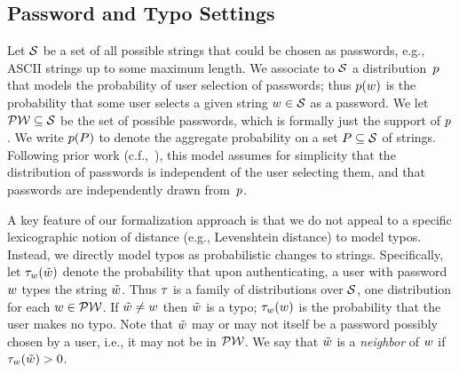 
\iffalse
A distance measure $\dist$ is a function
$\dist\Colon\PW\times\PW\rightarrow\R^+$.  We will often denote
$\dist(\pw,\pwtypo)$ by $\dist_\pw(\pwtypo)$.  The neighborhood of
$\delta$-close points of a password $\pw \in \PW$ is the set
$\ball_{\dist,\delta}(\pw) = \{\pwtypo \;|\; \pwtypo \in \PW
\textnormal{ and } \dist_\pw(\pwtypo) \le \delta\}$.
When $\dist$ and $\delta$ are clear from context we will write simply
$\ball(\pw)$ and call this the ball centered at $\pw$.
\fi

\subsection{Password and Typo Settings}

Let $\mathcal{S}$ be a set of all possible strings that could be chosen as
passwords, e.g., ASCII strings up to some maximum length.  We associate to
$\mathcal{S}$ a distribution~$p$ that models the probability of user
selection of passwords; thus $p({w})$ is the probability that some user
selects a given string ${w} \in \mathcal{S}$ as a password. We let $\mathcal{PW} \subseteq
\mathcal{S}$ be the set of possible passwords, which is formally just the support
of $p$.  We write $p(P)$ to denote the aggregate probability on a
set $P \subseteq \mathcal{S}$ of strings.  Following prior work
(c.f.,~\cite{bhos12}), this model assumes for simplicity that the distribution of
passwords is independent of the user selecting them, and that passwords are
independently drawn from~$p$.

A key feature of our formalization approach is that we do not appeal
to a specific lexicographic notion of distance (e.g., Levenshtein
distance) to model typos. Instead, we directly model typos as
probabilistic changes to strings. Specifically, let
$\tau_{{w}}(\tilde{w})$ denote the probability that upon
authenticating, a user with password $\pw$ types the string
$\tilde{w}$. Thus $\tau$ is a family of distributions over
$\mathcal{S}$, one distribution for each $\pw \in \PW$. If
$\tilde{w} \neq {w}$ then $\tilde{w}$ is a typo; $\tau_{{w}}({w})$ is
the probability that the user makes no typo. Note that $\tilde{w}$ may
or may not itself be a password possibly chosen by a user, i.e., it
may not be in $\mathcal{PW}$.  We say that $\tilde{w}$ is a \emph{neighbor} of
$\pw$ if $\tau_{w}(\tilde{w}) > 0$.  


